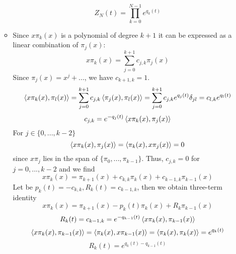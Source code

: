 \documentclass[12pt]{article}
\theoremstyle{definition}
\begin{document}
\begin{enumerate}
\begin{itemize}
\begin{multline}
        \end{multline}
        \begin{equation}
            \boxed{Z_N(t)=\prod\limits_{k=0}^{N-1}e^{q_k(t)}}
        \end{equation}
        \item Since $x\pi_k(x)$ is a polynomial of degree $k+1$ it can be expressed as a linear combination of $\pi_j(x)$:
        \begin{equation}
            x\pi_k(x)=\sum\limits_{j=0}^{k+1}c_{j,k}\pi_j(x)
        \end{equation}
        Since $\pi_j(x)=x^j+...$, we have $c_{k+1,k}=1$.
        \begin{equation}
            \braket{x\pi_k(x),\pi_l(x)}=\sum\limits_{j=0}^{k+1}c_{j,k}\braket{\pi_j(x),\pi_l(x)}=\sum\limits_{j=0}^{k+1}c_{j,k}e^{q_j(t)}\delta_{jl}=c_{l,k}e^{q_l(t)}
        \end{equation}
        \begin{equation}
            c_{j,k}=e^{-q_j(t)}\braket{x\pi_k(x),\pi_j(x)}
        \end{equation}
        For $j\in\{0,...,k-2\}$
        \begin{equation}
            \braket{x\pi_k(x),\pi_j(x)}=\braket{\pi_k(x),x\pi_j(x)}=0
        \end{equation}
        since $x\pi_j$ lies in the span of $\{\pi_0,...,\pi_{k-1}\}$. Thus, $c_{j,k} = 0$ for $j=0,...,k-2$ and we find
        \begin{equation}
            x\pi_k(x)=\pi_{k+1}(x)+c_{k,k}\pi_k(x)+c_{k-1,k}\pi_{k-1}(x)
        \end{equation}
        Let be $p_k(t)=-c_{k,k}, R_k(t)=c_{k-1,k}$, then we obtain three-term identity
        \begin{equation}
            \boxed{x\pi_k(x)=\pi_{k+1}(x)-p_k(t)\pi_k(x)+R_k\pi_{k-1}(x)}
        \end{equation}
        \begin{equation}
            R_k(t)=c_{k-1,k}=e^{-q_{k-1}(t)}\braket{x\pi_k(x),\pi_{k-1}(x)}
        \end{equation}
        \begin{equation}
            \braket{x\pi_k(x),\pi_{k-1}(x)}=\braket{\pi_k(x),x\pi_{k-1}(x)}=\braket{\pi_k(x),\pi_k(x)}=e^{q_k(t)}
        \end{equation}
        \begin{equation}
            \boxed{R_k(t)=e^{q_k(t)-q_{k-1}(t)}}
        \end{equation}

\end{itemize}
\end{enumerate}
\end{document}
